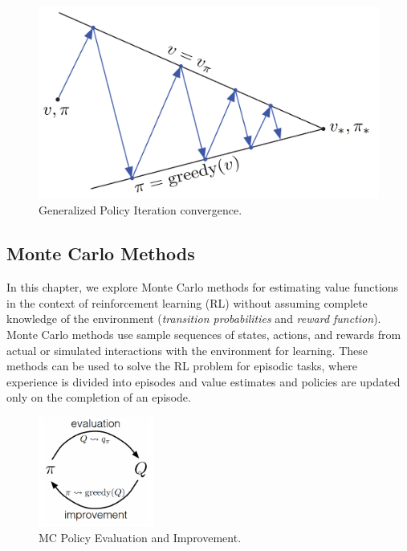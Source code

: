 \documentclass[../xlapes02]{subfiles}
\begin{document}
    \begin{figure}[h!]
        \centering
        \begin{minipage}[b]{0.5\textwidth}
            \includegraphics[width=\textwidth]{image/gpi2}
            \caption{Generalized Policy Iteration convergence.}
            \label{fig:gpi}
        \end{minipage}
    \end{figure}

    \subsection{Monte Carlo Methods}\label{subsec:monte-carlo-methods}
    In this chapter, we explore Monte Carlo methods for estimating value functions in the context of reinforcement learning (RL) without assuming complete knowledge of the environment (\emph{transition probabilities} and \emph{reward function}). Monte Carlo methods use sample sequences of states, actions, and rewards from actual or simulated interactions with the environment for learning. These methods can be used to solve the RL problem for episodic tasks, where experience is divided into episodes and value estimates and policies are updated only on the completion of an episode.

    \begin{figure}
        \begin{center}
            \includegraphics[width=0.34\textwidth]{image/mc-evaluation-improvement}
        \end{center}
        \caption{MC Policy Evaluation and Improvement.}
    \end{figure}
\end{document}

